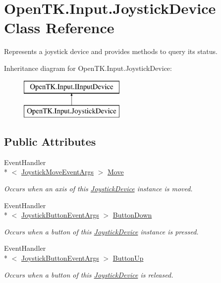 \hypertarget{class_open_t_k_1_1_input_1_1_joystick_device}{\section{Open\-T\-K.\-Input.\-Joystick\-Device Class Reference}
\label{class_open_t_k_1_1_input_1_1_joystick_device}
}


Represents a joystick device and provides methods to query its status.  


Inheritance diagram for Open\-T\-K.\-Input.\-Joystick\-Device\-:\begin{figure}[H]
\begin{center}
\leavevmode
\includegraphics[height=2.000000cm]{class_open_t_k_1_1_input_1_1_joystick_device}
\end{center}
\end{figure}
\subsection*{Public Attributes}
\begin{DoxyCompactItemize}
\item 
Event\-Handler\\*
$<$ \hyperlink{class_open_t_k_1_1_input_1_1_joystick_move_event_args}{Joystick\-Move\-Event\-Args} $>$ \hyperlink{class_open_t_k_1_1_input_1_1_joystick_device_ad9dcc4f6506c543d16e326c7ee08da39}{Move}
\begin{DoxyCompactList}\small\item\em Occurs when an axis of this \hyperlink{class_open_t_k_1_1_input_1_1_joystick_device}{Joystick\-Device} instance is moved. \end{DoxyCompactList}\item 
Event\-Handler\\*
$<$ \hyperlink{class_open_t_k_1_1_input_1_1_joystick_button_event_args}{Joystick\-Button\-Event\-Args} $>$ \hyperlink{class_open_t_k_1_1_input_1_1_joystick_device_a677045ca3c8a2ac98095680bb5746ede}{Button\-Down}
\begin{DoxyCompactList}\small\item\em Occurs when a button of this \hyperlink{class_open_t_k_1_1_input_1_1_joystick_device}{Joystick\-Device} instance is pressed. \end{DoxyCompactList}\item 
Event\-Handler\\*
$<$ \hyperlink{class_open_t_k_1_1_input_1_1_joystick_button_event_args}{Joystick\-Button\-Event\-Args} $>$ \hyperlink{class_open_t_k_1_1_input_1_1_joystick_device_a837891423d49811a2384c95f7576fbc2}{Button\-Up}
\begin{DoxyCompactList}\small\item\em Occurs when a button of this \hyperlink{class_open_t_k_1_1_input_1_1_joystick_device}{Joystick\-Device} is released. \end{DoxyCompactList}\end{DoxyCompactItemize}
